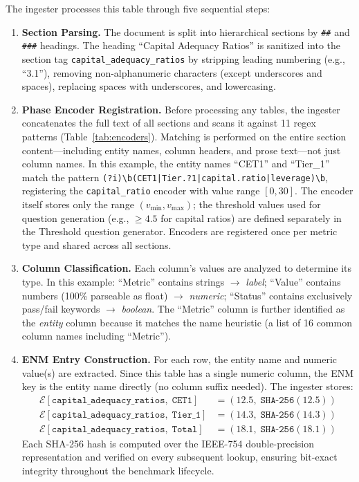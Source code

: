 \documentclass[11pt]{article}
\begin{document}
\noindent
The ingester processes this table through five sequential steps:

\begin{enumerate}[leftmargin=2em]

\item \textbf{Section Parsing.}
  The document is split into hierarchical sections by \texttt{\#\#}
  and \texttt{\#\#\#} headings.  The heading ``Capital Adequacy Ratios''
  is sanitized into the section tag
  \texttt{capital\_adequacy\_ratios} by stripping leading numbering
  (e.g., ``3.1''), removing non-alphanumeric characters (except
  underscores and spaces), replacing spaces with underscores, and
  lowercasing.

\item \textbf{Phase Encoder Registration.}
  Before processing any tables, the ingester concatenates the full text
  of all sections and scans it against 11 regex patterns
  (Table~\ref{tab:encoders}).  Matching is performed on the entire
  section content---including entity names, column headers, and prose
  text---not just column names.  In this example, the entity names
  ``CET1'' and ``Tier\_1'' match the pattern
  \texttt{(?i)\textbackslash b(CET1|Tier.?1|capital.ratio|leverage)\textbackslash b},
  registering the \texttt{capital\_ratio}
  encoder with value range $[0, 30]$.  The encoder itself stores only
  the range $(v_{\min}, v_{\max})$; the threshold values used for
  question generation (e.g., $\geq 4.5$ for capital ratios) are
  defined separately in the Threshold question generator.  Encoders
  are registered once per metric type and shared across all sections.

\item \textbf{Column Classification.}
  Each column's values are analyzed to determine its type.
  In this example: ``Metric'' contains strings $\to$ \textit{label};
  ``Value'' contains numbers (100\% parseable as float) $\to$ \textit{numeric};
  ``Status'' contains exclusively pass/fail keywords $\to$ \textit{boolean}.
  The ``Metric'' column is further identified as the \textit{entity}
  column because it matches the name heuristic (a list of 16 common
  column names including ``Metric'').

\item \textbf{ENM Entry Construction.}
  For each row, the entity name and numeric value(s) are extracted.
  Since this table has a single numeric column, the ENM key is the
  entity name directly (no column suffix needed).  The ingester stores:
  \begin{align*}
    \mathcal{E}[\texttt{capital\_adequacy\_ratios},\; \texttt{CET1}]
      &= (12.5,\; \texttt{SHA-256}(12.5)) \\
    \mathcal{E}[\texttt{capital\_adequacy\_ratios},\; \texttt{Tier\_1}]
      &= (14.3,\; \texttt{SHA-256}(14.3)) \\
    \mathcal{E}[\texttt{capital\_adequacy\_ratios},\; \texttt{Total}]
      &= (18.1,\; \texttt{SHA-256}(18.1))
  \end{align*}
  Each SHA-256 hash is computed over the IEEE-754 double-precision
  representation and verified on every subsequent lookup, ensuring
  bit-exact integrity throughout the benchmark lifecycle.


\end{enumerate}
\end{document}

